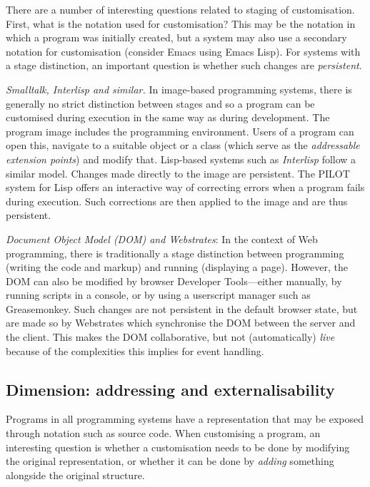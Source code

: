 \documentclass[ twoside,openright,titlepage,numbers=noenddot,headinclude,footinclude,cleardoublepage=empty,abstract=on,
                BCOR=5mm,paper=a4,fontsize=11pt
                ]{scrreprt}
\theoremstyle{definition}
\begin{document}
There are a number of interesting questions related to staging of
customisation. First, what is the notation used for customisation? This
may be the notation in which a program was initially created, but a
system may also use a secondary notation for customisation (consider
Emacs using Emacs Lisp). For systems with a stage distinction, an
important question is whether such changes are \emph{persistent}.

\emph{Smalltalk, Interlisp and similar.} In image-based programming
systems, there is generally no strict distinction between stages and so
a program can be customised during execution in the same way as during
development. The program image includes the programming environment.
Users of a program can open this, navigate to a suitable object or a
class (which serve as the \emph{addressable extension points}) and
modify that. Lisp-based systems such as \emph{Interlisp} follow a
similar model. Changes made directly to the image are persistent. The
PILOT system for Lisp \parencite{Pilot} offers an interactive way of
correcting errors when a program fails during execution. Such
corrections are then applied to the image and are thus persistent.

\emph{Document Object Model (DOM) and Webstrates}: In the context of Web
programming, there is traditionally a stage distinction between
programming (writing the code and markup) and running (displaying a
page). However, the DOM can also be modified by browser Developer
Tools---either manually, by running scripts in a console, or by using a
userscript manager such as Greasemonkey. Such changes are not persistent
in the default browser state, but are made so by Webstrates
\parencite{Webstrates} which synchronise the DOM between the server and
the client. This makes the DOM collaborative, but not (automatically)
\emph{live} because of the complexities this implies for event handling.

\hypertarget{dimension-addressing-and-externalisability}{\subsection{Dimension: addressing and
externalisability}\label{dimension-addressing-and-externalisability}}

Programs in all programming systems have a representation that may be
exposed through notation such as source code. When customising a
program, an interesting question is whether a customisation needs to be
done by modifying the original representation, or whether it can be done
by \emph{adding} something alongside the original structure.
\end{document}
